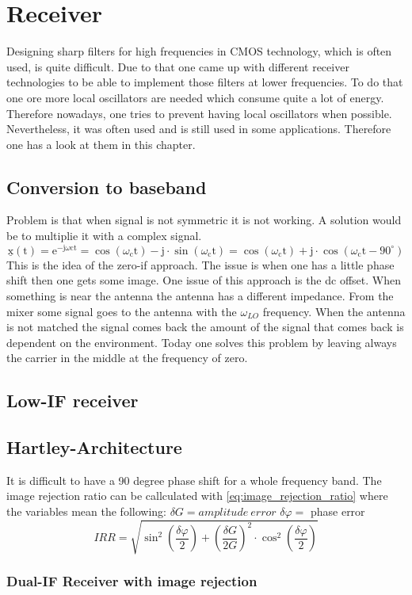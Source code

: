 \section{Receiver}
Designing sharp filters for high frequencies in CMOS technology, which is often used, is quite difficult. Due to that one came up with different receiver technologies to be able to implement those filters at lower frequencies. To do that one ore more local oscillators are needed which consume quite a lot of energy. Therefore nowadays, one tries to prevent having local oscillators when possible. Nevertheless, it was often used and is still used in some applications. Therefore one has a look at them in this chapter.
\subsection{Conversion to baseband}
Problem is that when signal is not symmetric it is not working. A solution would be to multiplie it with a complex signal.
\begin{equation}
\underline{\mathrm{x}}(\mathrm{t})=\mathrm{e}^{-\mathrm{j} \omega \mathrm{ct}}=\cos \left(\omega_{\mathrm{c}} \mathrm{t}\right)-\mathrm{j} \cdot \sin \left(\omega_{\mathrm{c}} \mathrm{t}\right)=\cos \left(\omega_{\mathrm{c}} \mathrm{t}\right)+\mathrm{j} \cdot \cos \left(\omega_{\mathrm{c}} \mathrm{t}-90^{\circ}\right)
\end{equation}
This is the idea of the zero-if approach. The issue is when one has a little phase shift then one gets some image. One issue of this approach is the dc offset.
When something is near the antenna the antenna has a different impedance. From the mixer some signal goes to the antenna with the $\omega_{LO}$ frequency. When the antenna is not matched the signal comes back the amount of the signal that comes back is dependent on the environment. Today one solves this problem by leaving always the carrier in the middle at the frequency of zero.
\subsection{Low-IF receiver}
\subsection{Hartley-Architecture}
It is difficult to have a 90 degree phase shift for a whole frequency band.
The image rejection ratio can be callculated with \autoref{eq:image_rejection_ratio} where the variables mean the following:\newline
$\delta G=a m p l i t u d e ~ e r r o r$\newline
$\delta \varphi=$ phase error\newline
\begin{equation}\label{eq:image_rejection_ratio}
I R R=\sqrt{\sin ^2\left(\frac{\delta \varphi}{2}\right)+\left(\frac{\delta G}{2 G}\right)^2 \cdot \cos ^2\left(\frac{\delta \varphi}{2}\right)}
\end{equation}

\subsubsection{Dual-IF Receiver with image rejection}

